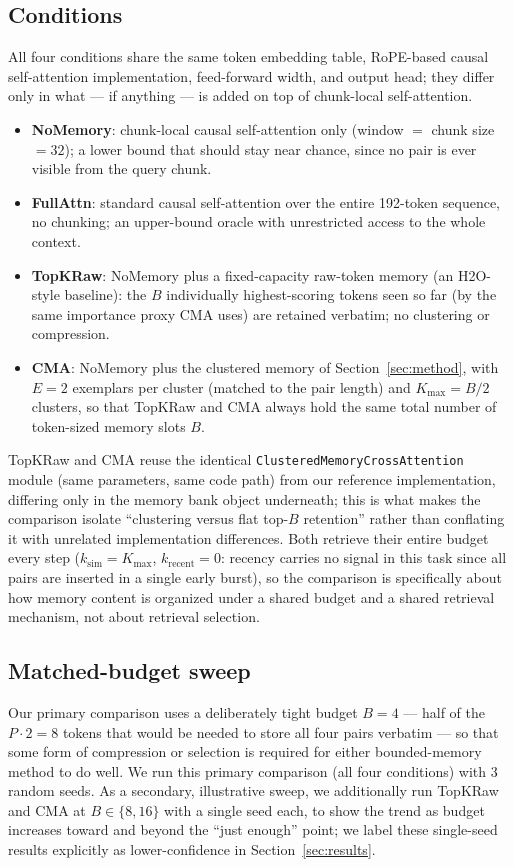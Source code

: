 \documentclass[11pt]{article}
\begin{document}
\subsection{Conditions}
All four conditions share the same token embedding table, RoPE-based causal self-attention
implementation, feed-forward width, and output head; they differ only in what --- if anything ---
is added on top of chunk-local self-attention.
\begin{itemize}[leftmargin=1.4em,itemsep=1pt]
\item \textbf{NoMemory}: chunk-local causal self-attention only (window $=$ chunk size $=32$);
a lower bound that should stay near chance, since no pair is ever visible from the query chunk.
\item \textbf{FullAttn}: standard causal self-attention over the entire 192-token sequence, no
chunking; an upper-bound oracle with unrestricted access to the whole context.
\item \textbf{TopKRaw}: NoMemory plus a fixed-capacity raw-token memory (an H2O-style baseline):
the $B$ individually highest-scoring tokens seen so far (by the same importance proxy CMA uses)
are retained verbatim; no clustering or compression.
\item \textbf{CMA}: NoMemory plus the clustered memory of Section~\ref{sec:method}, with
$E{=}2$ exemplars per cluster (matched to the pair length) and $K_{\max} = B/2$ clusters, so
that TopKRaw and CMA always hold the same total number of token-sized memory slots $B$.
\end{itemize}
TopKRaw and CMA reuse the identical \texttt{ClusteredMemoryCrossAttention} module (same
parameters, same code path) from our reference implementation, differing only in the memory
bank object underneath; this is what makes the comparison isolate ``clustering versus flat
top-$B$ retention'' rather than conflating it with unrelated implementation differences. Both
retrieve their entire budget every step ($k_{\text{sim}} = K_{\max}$, $k_{\text{recent}}=0$:
recency carries no signal in this task since all pairs are inserted in a single early burst),
so the comparison is specifically about how memory content is organized under a shared budget
and a shared retrieval mechanism, not about retrieval selection.

\subsection{Matched-budget sweep}
Our primary comparison uses a deliberately tight budget $B{=}4$ --- half of the $P \cdot 2 = 8$
tokens that would be needed to store all four pairs verbatim --- so that some form of
compression or selection is required for either bounded-memory method to do well. We run this
primary comparison (all four conditions) with 3 random seeds. As a secondary, illustrative
sweep, we additionally run TopKRaw and CMA at $B \in \{8, 16\}$ with a single seed each, to show
the trend as budget increases toward and beyond the ``just enough'' point; we label these
single-seed results explicitly as lower-confidence in Section~\ref{sec:results}.
\end{document}
